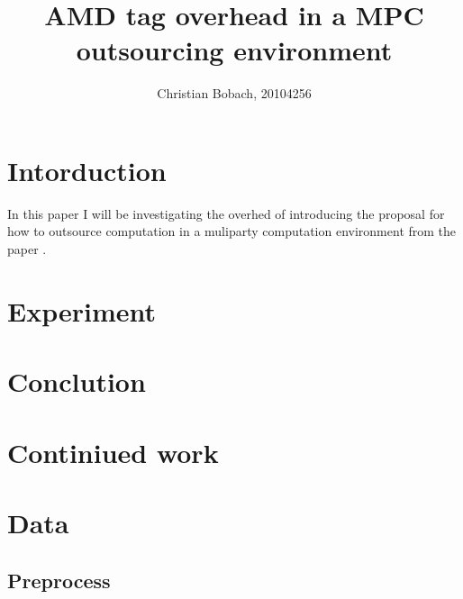 \documentclass[10pt,a4paper]{article}
\author{Christian Bobach, 20104256}
\title{AMD tag overhead in a MPC outsourcing environment}
\begin{document}
\maketitle

\begin{abstract}

\end{abstract}
\pagebreak

\tableofcontents
\pagebreak

\section{Intorduction}
In this paper I will be investigating the overhed of introducing the proposal for how to outsource computation in a muliparty computation environment from the paper \cite{fosc}. 



\section{Experiment}


\section{Conclution}


\section{Continiued work}

\pagebreak




\appendix

\section{Data}


\subsection{Preprocess}
\end{document}
